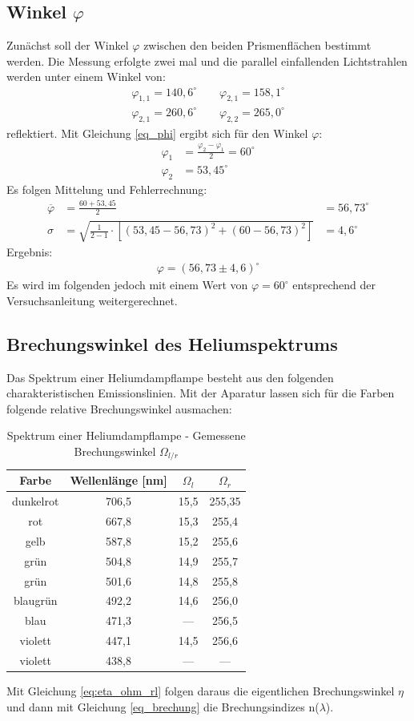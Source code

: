 \subsection{Winkel $\varphi$}
Zunächst soll der Winkel $\varphi$ zwischen den beiden Prismenflächen bestimmt werden. Die Messung erfolgte zwei mal und die parallel einfallenden Lichtstrahlen werden unter einem Winkel von:
\begin{align*}
\varphi_{1,1}=140,6^\circ \qquad \varphi_{2,1}=158,1^\circ\\
\varphi_{2,1}=260,6^\circ \qquad \varphi_{2,2}=265,0^\circ
\end{align*}
reflektiert. Mit Gleichung \eqref{eq_phi} ergibt sich für den Winkel $\varphi$:
\begin{align*}
\varphi_1 &= \frac{\varphi_2-\varphi_1}{2}=60^\circ\\
\varphi_2 &=53,45^\circ
\end{align*}
Es folgen Mittelung und Fehlerrechnung:
\begin{align*}
\overline{\varphi} &= \frac{60+53,45}{2}&=56,73^\circ\\
\sigma&= \sqrt{\frac{1}{2-1}\cdot\left[ \left(53,45-56,73\right)^2+\left(60-56,73\right)^2\right]}&=4,6^\circ
\end{align*}
Ergebnis:
\begin{align*}
\varphi=(56,73\pm4,6)^\circ
\end{align*}
Es wird im folgenden jedoch mit einem Wert von $\varphi=60^\circ$ entsprechend der Versuchsanleitung weitergerechnet.
\subsection{Brechungswinkel des Heliumspektrums}
Das Spektrum einer Heliumdampflampe besteht aus den folgenden charakteristischen Emissionslinien.
Mit der Aparatur lassen sich für die Farben folgende relative Brechungswinkel ausmachen:
\begin{table}[H]
\begin{tabular}{|c|c|c|c|}
Farbe &		Wellenlänge [nm] &$\Omega_l$&	$\Omega_r$ \\ \hline
dunkelrot	&706,5 		&15,5		&255,35 \\ \hline
rot			&	667,8	&15,3		&255,4 	\\ \hline
gelb		&	587,8	&15,2		&255,6 	\\ \hline
grün		&	504,8	&14,9		&255,7 	\\ \hline
grün		&	501,6	&14,8		&255,8 	\\ \hline
blaugrün	&	492,2	&14,6		&256,0 	\\ \hline
blau		&	471,3	& ---		&256,5 	\\ \hline
violett		&	447,1	&14,5		&256,6 	\\ \hline
violett		&	438,8	& ---		& --- 	\\ \hline
\end{tabular} 
\caption{Spektrum einer Heliumdampflampe - Gemessene Brechungswinkel $\Omega_{l/r}$}
\label{tab_messwerte}
\end{table}
\newpage
Mit Gleichung \eqref{eq:eta_ohm_rl} folgen daraus die eigentlichen Brechungswinkel $\eta$ und dann mit Gleichung \eqref{eq_brechung} die Brechungsindizes n($\lambda$).

